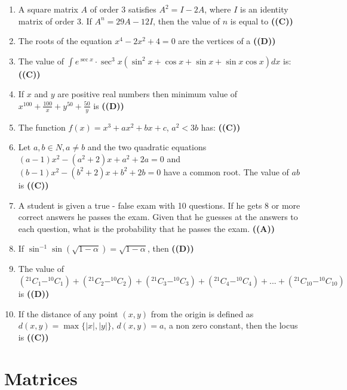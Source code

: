 \documentclass{article}
\begin{document}
\begin{enumerate}
\item A square matrix $A$ of order 3 satisfies $A^2 = I - 2A$, where $I$ is an identity matrix of order 3. If $A^n = 29A - 12I$, then the value of $n$ is equal to \hfill \textbf{((C))}
\item The roots of the equation $x^4 - 2x^2 + 4 = 0$ are the vertices of a \hfill \textbf{((D))}
\item The value of $\int e^{\sec x} \cdot \sec^3 x (\sin^2 x + \cos x + \sin x + \sin x \cos x) dx$ is: \hfill \textbf{((C))}
\item If $x$ and $y$ are positive real numbers then minimum value of $x^{100} + \frac{100}{x} + y^{50} + \frac{50}{y}$ is \hfill \textbf{((D))}
\item The function $f(x) = x^3 + ax^2 + bx + c$, $a^2 < 3b$ has: \hfill \textbf{((C))}
\item Let $a, b \in N, a \neq b$ and the two quadratic equations $(a - 1)x^2 - (a^2 + 2) x + a^2 + 2a = 0$ and $(b - 1)x^2 - (b^2 + 2) x + b^2 + 2b = 0$ have a common root. The value of $ab$ is \hfill \textbf{((C))}
\item A student is given a true - false exam with 10 questions. If he gets 8 or more correct answers he passes the exam. Given that he guesses at the answers to each question, what is the probability that he passes the exam. \hfill \textbf{((A))}
\item If $\sin^{-1} \sin(\sqrt{1 - \alpha}) = \sqrt{1 - \alpha}$, then \hfill \textbf{((D))}
\item The value of $(^{21}C_1 - ^{10}C_1)+(^{21}C_2 - ^{10}C_2)+(^{21}C_3 - ^{10}C_3)+(^{21}C_4 - ^{10}C_4)+...+(^{21}C_{10} - ^{10}C_{10})$ is \hfill \textbf{((D))}
\item If the distance of any point $(x, y)$ from the origin is defined as $d(x, y) = \max\{|x|, |y|\}$, $d(x, y) = a$, a non zero constant, then the locus is \hfill \textbf{((C))}
\end{enumerate}
\section{Matrices}
\end{document}
